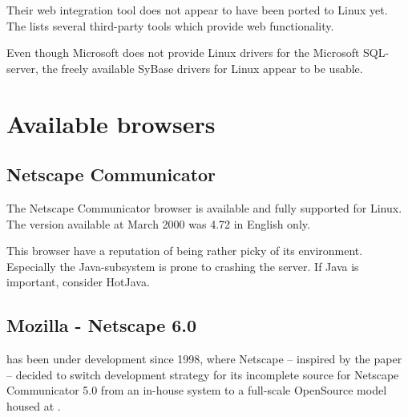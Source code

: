   Their web integration tool does not appear to have been ported to
  Linux yet.  The  lists several third-party tools which provide web
  functionality.

  Even though Microsoft does not provide Linux drivers for the
  Microsoft SQL-server, the freely available SyBase drivers for Linux
  appear to be usable.




\section{Available browsers}

\subsection{Netscape Communicator}
\label{sec:netscape-communicator}

The Netscape Communicator browser is available and fully supported for
Linux.  The version available at March 2000 was 4.72 in English only.

This browser have a reputation of being rather picky of its
environment.  Especially the Java-subsystem is prone to crashing the
server.  If Java is important, consider HotJava.


\subsection{Mozilla - Netscape 6.0}
\label{sec:mozilla}

 has been under
development since 1998, where Netscape -- inspired by the  paper -- decided to switch development
strategy for its incomplete source for Netscape Communicator 5.0 from
an in-house system to a full-scale OpenSource model housed at
.


